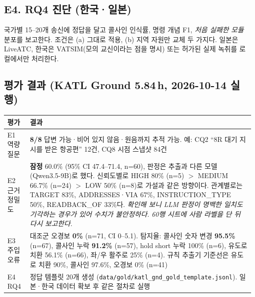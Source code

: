 \documentclass[10pt,a4paper]{article}
\begin{document}
\subsection*{E4. RQ4 진단 (한국·일본)}
국가별 15--20개 송신에 정답을 달고 콜사인 인식률, 명령 개념 F1, \emph{처음 실패한 모듈} 분포를 보고한다. 조건은 (a) 그대로 적용, (b) 지역 자원만 교체 두 가지다. 일본은 LiveATC, 한국은 VATSIM(모의 교신이라는 점을 명시) 또는 허가된 실제 녹취를 로컬에서만 처리한다.

\subsection*{평가 결과 (KATL Ground 5.84\,h, 2026-10-14 실행)}
\begin{center}\small
\begin{tabularx}{\textwidth}{@{}l>{\raggedright\arraybackslash}X@{}}
\toprule
평가 & 결과\\\midrule
E1 역량 질문 & \textbf{8/8} 답변 가능·비어 있지 않음·원음까지 추적 가능. 예: CQ2 ``8R 대기 지시를 받은 항공편'' 12건, CQ8 시점 스냅샷 84건\\
E2 근거 정밀도 & \textbf{잠정} 60.0\% (95\% CI 47.4--71.4, n=60), 판정은 추출과 다른 모델(Qwen3.5-9B)로 했다. 신뢰도별로 HIGH 80\% (n=5) $>$ MEDIUM 66.7\% (n=24) $>$ LOW 50\% (n=8)로 가설과 같은 방향이다. 관계별로는 TARGET 83\%, ADDRESSES·VIA 67\%, INSTRUCTION\_TYPE 50\%, READBACK\_OF 33\%다. \emph{확인해 보니 LLM 판정이 명백한 일치도 기각하는 경우가 있어 수치가 불안정하다. 60행 시트에 사람 라벨을 단 뒤 다시 보고한다.}\\
E3 주입 오류 & 대조군 오경보 \textbf{0\%} (n=71, CI 0--5.1). 탐지율: 콜사인 숫자 변경 \textbf{95.5\%} (n=67), 콜사인 누락 \textbf{91.2\%} (n=57), hold short 누락 100\% (n=6), 유도로 치환 56.1\% (n=66), 좌/우 활주로 25\% (n=4). 규칙 추출기 기준선은 유도로 치환 90\%, 콜사인 97.6\%, 오경보 0\% (n=41)\\
E4 RQ4 & 정답 템플릿 20개 생성 (\texttt{data/gold/katl\_gnd\_gold\_template.jsonl}). 일본·한국 데이터 확보 후 같은 절차로 실행\\
\bottomrule
\end{tabularx}
\end{center}
\end{document}
